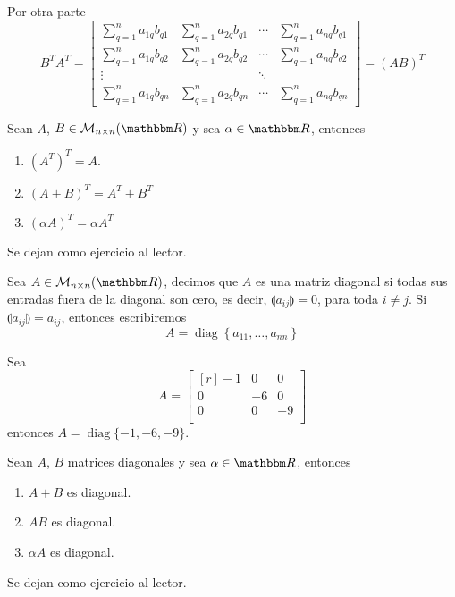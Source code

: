 \begin{theorem}
    Por otra parte
    $$B^T A^T = \begin{bmatrix}
        \displaystyle\sum_{q=1}^{n} a_{1q}b_{q1} & \displaystyle\sum_{q=1}^{n} a_{2q}b_{q1} & \cdots & \displaystyle\sum_{q=1}^{n} a_{nq}b_{q1} \\
        \displaystyle\sum_{q=1}^{n} a_{1q}b_{q2} & \displaystyle\sum_{q=1}^{n} a_{2q}b_{q2} & \cdots & \displaystyle\sum_{q=1}^{n} a_{nq}b_{q2} \\
        \vdots & & \ddots & \\
        \displaystyle\sum_{q=1}^{n} a_{1q}b_{qn} & \displaystyle\sum_{q=1}^{n} a_{2q}b_{qn} & \cdots & \displaystyle\sum_{q=1}^{n} a_{nq}b_{qn} 
    \end{bmatrix} = (AB)^T$$
\end{theorem}

\begin{proposition}
    Sean $A$, $B \in \mathcal{M}_{n \times n}(\RR)$ y sea $\alpha \in \RR$, entonces
    \begin{enumerate}[label=\roman*.]
        \item $\left(A^T\right)^T = A$.
        \item $(A + B)^T = A^T + B^T$
        \item $(\alpha A)^T = \alpha A^T$
    \end{enumerate}
    \demostracion Se dejan como ejercicio al lector.
\end{proposition}

\begin{definition}
    Sea $A \in \mathcal{M}_{n \times n}(\RR)$, decimos que $A$ es una matriz diagonal si todas sus entradas fuera de la diagonal son cero, es decir, $\llparenthesis a_{ij} \rrparenthesis = 0$, para toda $i \neq j$. Si $\llparenthesis a_{ij} \rrparenthesis = a_{ij}$, entonces escribiremos $$A = \operatorname{diag} \left\lbrace a_{11}, \dots, a_{nn} \right\rbrace$$
\end{definition}

\begin{example}
    Sea
    $$A = \begin{bmatrix*}[r]
        -1 & 0 & 0 \\
        0 & -6 & 0 \\
        0 & 0 & -9 \\
    \end{bmatrix*}$$
    entonces $A = \operatorname{diag} \{ -1, -6, -9 \}$.
\end{example}

\begin{proposition}
    Sean $A$, $B$ matrices diagonales y sea $\alpha \in \RR$, entonces
    \begin{enumerate}[label=\roman*.]
        \item $A+B$ es diagonal.
        \item $AB$ es diagonal.
        \item $\alpha A$ es diagonal.
    \end{enumerate}
    \demostracion Se dejan como ejercicio al lector.
\end{proposition}

